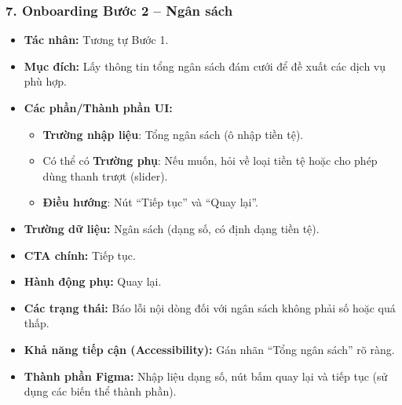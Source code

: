 \documentclass[11pt,a4paper]{article}
\begin{document}
\subsubsection{7. Onboarding Bước 2 – Ngân sách}
\begin{itemize}
    \item \textbf{Tác nhân:} Tương tự Bước 1.
    \item \textbf{Mục đích:} Lấy thông tin tổng ngân sách đám cưới để đề xuất các dịch vụ phù hợp.
    \item \textbf{Các phần/Thành phần UI:}
    \begin{itemize}
        \item \textbf{Trường nhập liệu}: Tổng ngân sách (ô nhập tiền tệ).
        \item Có thể có \textbf{Trường phụ}: Nếu muốn, hỏi về loại tiền tệ hoặc cho phép dùng thanh trượt (slider).
        \item \textbf{Điều hướng}: Nút ``Tiếp tục'' và ``Quay lại''.
    \end{itemize}
    \item \textbf{Trường dữ liệu:} Ngân sách (dạng số, có định dạng tiền tệ).
    \item \textbf{CTA chính:} Tiếp tục.
    \item \textbf{Hành động phụ:} Quay lại.
    \item \textbf{Các trạng thái:} Báo lỗi nội dòng đối với ngân sách không phải số hoặc quá thấp.
    \item \textbf{Khả năng tiếp cận (Accessibility):} Gán nhãn ``Tổng ngân sách'' rõ ràng.
    \item \textbf{Thành phần Figma:} Nhập liệu dạng số, nút bấm quay lại và tiếp tục (sử dụng các biến thể thành phần).
\end{itemize}
\end{document}
